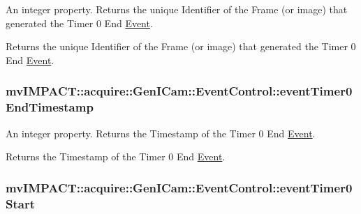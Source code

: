 An integer property. Returns the unique Identifier of the Frame (or image) that generated the Timer 0 End \hyperlink{classmv_i_m_p_a_c_t_1_1acquire_1_1_event}{Event}. 

Returns the unique Identifier of the Frame (or image) that generated the Timer 0 End \hyperlink{classmv_i_m_p_a_c_t_1_1acquire_1_1_event}{Event}. \hypertarget{classmv_i_m_p_a_c_t_1_1acquire_1_1_gen_i_cam_1_1_event_control_a6411179f8c9814d88d754f88576814d6}{
\subsubsection[{event\+Timer0\+End\+Timestamp}]{ mv\+I\+M\+P\+A\+C\+T\+::acquire\+::\+Gen\+I\+Cam\+::\+Event\+Control\+::event\+Timer0\+End\+Timestamp}}\label{classmv_i_m_p_a_c_t_1_1acquire_1_1_gen_i_cam_1_1_event_control_a6411179f8c9814d88d754f88576814d6}


An integer property. Returns the Timestamp of the Timer 0 End \hyperlink{classmv_i_m_p_a_c_t_1_1acquire_1_1_event}{Event}. 

Returns the Timestamp of the Timer 0 End \hyperlink{classmv_i_m_p_a_c_t_1_1acquire_1_1_event}{Event}. \hypertarget{classmv_i_m_p_a_c_t_1_1acquire_1_1_gen_i_cam_1_1_event_control_a7567a138d8154266146c43b9694c3b71}{
\subsubsection[{event\+Timer0\+Start}]{ mv\+I\+M\+P\+A\+C\+T\+::acquire\+::\+Gen\+I\+Cam\+::\+Event\+Control\+::event\+Timer0\+Start}}\label{classmv_i_m_p_a_c_t_1_1acquire_1_1_gen_i_cam_1_1_event_control_a7567a138d8154266146c43b9694c3b71}



